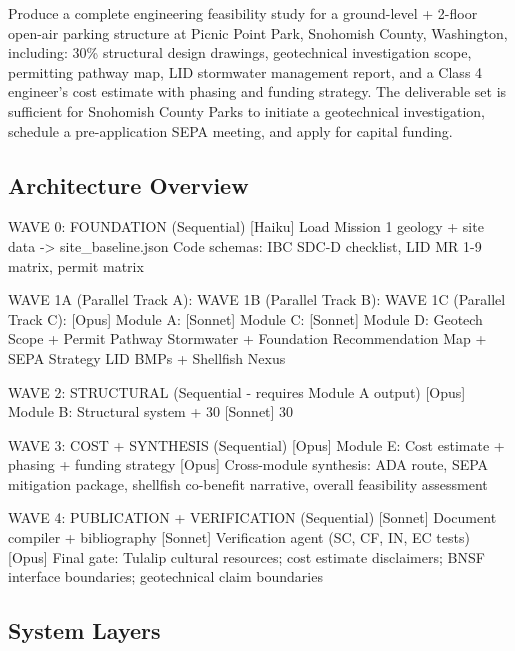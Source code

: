 \documentclass[11pt,letterpaper]{article}
\begin{document}
Produce a complete engineering feasibility study for a ground-level + 2-floor open-air parking structure at Picnic Point Park, Snohomish County, Washington, including: 30\% structural design drawings, geotechnical investigation scope, permitting pathway map, LID stormwater management report, and a Class 4 engineer's cost estimate with phasing and funding strategy. The deliverable set is sufficient for Snohomish County Parks to initiate a geotechnical investigation, schedule a pre-application SEPA meeting, and apply for capital funding.

\subsection{Architecture Overview}

\begin{asciibox}
WAVE 0: FOUNDATION (Sequential)
  [Haiku] Load Mission 1 geology + site data -> site_baseline.json
         Code schemas: IBC SDC-D checklist, LID MR 1-9 matrix, permit matrix

WAVE 1A (Parallel Track A):        WAVE 1B (Parallel Track B):      WAVE 1C (Parallel Track C):
  [Opus]  Module A:                [Sonnet] Module C:               [Sonnet] Module D:
  Geotech Scope +                  Permit Pathway                   Stormwater +
  Foundation Recommendation        Map + SEPA Strategy              LID BMPs +
                                                                    Shellfish Nexus

WAVE 2: STRUCTURAL (Sequential - requires Module A output)
  [Opus]   Module B: Structural system + 30%
  [Sonnet] 30%

WAVE 3: COST + SYNTHESIS (Sequential)
  [Opus]   Module E: Cost estimate + phasing + funding strategy
  [Opus]   Cross-module synthesis: ADA route, SEPA mitigation package,
           shellfish co-benefit narrative, overall feasibility assessment

WAVE 4: PUBLICATION + VERIFICATION (Sequential)
  [Sonnet] Document compiler + bibliography
  [Sonnet] Verification agent (SC, CF, IN, EC tests)
  [Opus]   Final gate: Tulalip cultural resources; cost estimate disclaimers;
           BNSF interface boundaries; geotechnical claim boundaries
\end{asciibox}

\subsection{System Layers}
\end{document}
